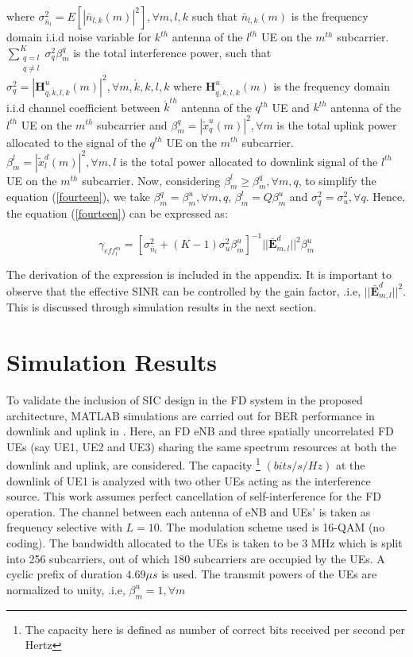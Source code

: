 \documentclass[conference]{IEEEtran}
\begin{document}
where $\sigma_{\bar{n}_l}^2 = E[|\bar{n}_{l,k}(m)|^2], \forall m, l, k$ such that $\bar{n}_{l,k}(m)$ is the frequency domain i.i.d noise variable for $k^{th}$ antenna of the $l^{th}$ UE on the $m^{th}$ subcarrier. $\sum_{\substack{ q=l \\ q \neq l}}^{K} \sigma_q^2 \beta_m^q$ is the total interference power, such that $\sigma_q^2 = |\mathbf{H}^u_{q,\acute{k},l,k}(m)|^2, \forall m,\acute{k}, k, l, k$ where $\mathbf{H}^u_{q,\acute{k},l,k}(m)$ is the frequency domain i.i.d channel coefficient between $\acute{k}^{th}$ antenna of the $q^{th}$ UE and $k^{th}$ antenna of the $l^{th}$ UE on the $m^{th}$ subcarrier and $\beta_m^q = |\tilde{x}^u_q(m)|^2, \forall m$ is the total uplink power allocated to the signal of the $q^{th}$ UE on the $m^{th}$ subcarrier.  $\beta_m^l = |\tilde{x}^d_l(m)|^2, \forall m, l$ is the total power allocated to downlink signal of the $l^{th}$ UE on the $m^{th}$ subcarrier. Now, considering $\beta_m^l \geq \beta_m^q, \forall m,q$, to simplify the equation (\ref{fourteen}), we take $\beta_m^q = \beta_m^u, \forall m,q$, $\beta_m^l= Q\beta_m^u $ and $\sigma_q^2 = \sigma_u^2, \forall q$. Hence, the equation (\ref{fourteen}) can be expressed as: \vspace{-0.50em}

\begin{equation}
       \label{fifteen}
      \gamma_{eff^m_l} = [\sigma_{\bar{n}_l}^2 + (K-1) \sigma_u^2 \beta^u_m ]^{-1}||\mathbf{\bar{E}}^d_{m,l}||^2 \beta_m^u
       \end{equation}

The derivation of the expression is included in the appendix. It is important to observe that the effective SINR can be controlled by the gain factor, .i.e, $||\mathbf{\bar{E}}^d_{m,l}||^2$. This is discussed through simulation results in the next section. 

\section{Simulation Results}
To validate the inclusion of SIC design in the FD system in the proposed architecture, MATLAB simulations are carried out for BER performance in downlink and uplink in \cite{ants}. Here, an FD eNB and three spatially uncorrelated FD UEs (say UE1, UE2 and UE3) sharing the same spectrum resources at both the downlink and uplink, are considered. The capacity \footnote{The capacity here is defined as number of correct bits received per second per Hertz} $(bits/s/Hz)$ at the downlink of UE1 is analyzed with two other UEs acting as the interference source. This work assumes perfect cancellation of self-interference for the FD operation. The channel between each antenna of eNB and UEs' is taken as frequency selective with $L=10$. The modulation scheme used is 16-QAM (no coding). The bandwidth allocated to the UEs is taken to be 3 MHz which is split into 256 subcarriers, out of which 180 subcarriers are occupied by the UEs. A cyclic prefix of duration $4.69 \mu s$ is used. The transmit powers of the UEs are normalized to unity, .i.e, $\beta_m^u = 1, \forall m$ \par
\end{document}
